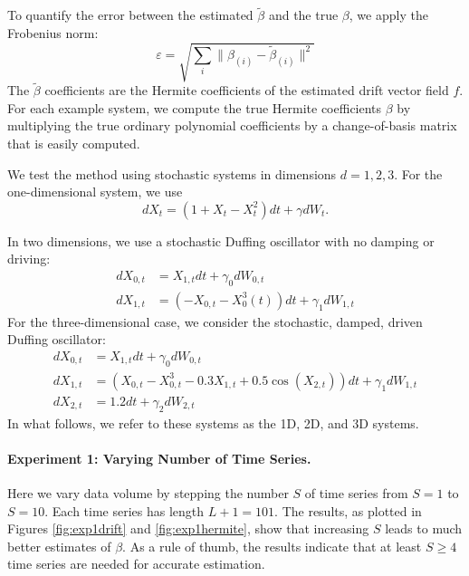 \documentclass{article}
\begin{document}
To quantify the error between the estimated $\widetilde{\beta}$ and the true $\beta$, we apply the Frobenius norm:
\begin{equation}
\label{eqn:frob}
\varepsilon = \sqrt{\sum_i \| \beta_{(i)} - \widetilde{\beta}_{(i)} \|^2 }
\end{equation}
The $\widetilde{\beta}$ coefficients are the Hermite coefficients of the estimated drift vector field $f$.  For each example system, we compute the true Hermite coefficients $\beta$ by multiplying the true ordinary polynomial coefficients by a change-of-basis matrix that is easily computed.

We test the method using stochastic systems in dimensions $d= 1, 2, 3$.
For the one-dimensional system, we use
\begin{equation*}
dX_t = (1 + X_t - X_t^2 ) dt + \gamma dW_t.
\end{equation*}

In two dimensions, we use a stochastic Duffing oscillator with no damping or driving:
\begin{align*}
dX_{0,t} &= X_{1,t} dt + \gamma_0 dW_{0,t} \\
dX_{1,t} &= (-X_{0,t} - X^3_0(t)) dt + \gamma_1 dW_{1,t}
\end{align*}
For the three-dimensional case, we consider the stochastic, damped, driven Duffing oscillator:
\begin{align*}
dX_{0,t} & = X_{1,t} dt + \gamma_0 dW_{0,t} \\
dX_{1,t} & = (X_{0,t} - X_{0,t}^3 - 0.3 X_{1,t} + 0.5 \cos (X_{2,t})) dt + \gamma_1 dW_{1,t} \\
dX_{2,t} & = 1.2 dt + \gamma_2 dW_{2,t}
\end{align*}
In what follows, we refer to these systems as the 1D, 2D, and 3D systems.

\paragraph{Experiment 1: Varying Number of Time Series.} Here we vary data volume by stepping the number $S$ of time series from $S=1$ to $S=10$.  Each time series has length $L+1 = 101$.  The results, as plotted in Figures \ref{fig:exp1drift} and \ref{fig:exp1hermite}, show that increasing $S$ leads to much better estimates of $\beta$.  As a rule of thumb, the results indicate that at least $S \geq 4$ time series are needed for accurate estimation.
\end{document}
